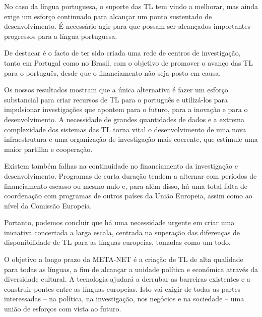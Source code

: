 \documentclass[]{../metanetpaper}
\begin{document}
\begin{multicols}{2}
No caso da língua portuguesa, o suporte das TL tem vindo a melhorar, mas ainda exige um esforço continuado para alcançar um ponto sustentado de desenvolvimento. É necessário agir para que possam ser alcançados importantes progressos para a língua portuguesa.

De destacar é o facto de ter sido criada uma rede de centros de investigação, tanto em Portugal como no Brasil, com o objetivo de promover o avanço das TL para o português, desde que o financiamento não seja posto em causa.

Os nossos resultados mostram que a única alternativa é fazer um esforço substancial para criar recursos de TL para o português e utilizá-los para impulsionar investigações que apontem para o futuro, para a inovação e para o desenvolvimento. A necessidade de grandes quantidades de dados e a extrema complexidade dos sistemas das TL torna vital o desenvolvimento de uma nova infraestrutura e uma organização de investigação mais coerente, que estimule uma maior partilha e cooperação.

Existem também falhas na continuidade no financiamento da investigação e desenvolvimento. Programas de curta duração tendem a alternar com períodos de financiamento escasso ou mesmo nulo e, para além disso, há uma total falta de coordenação com programas de outros países da União Europeia, assim como ao nível da Comissão Europeia.

Portanto, podemos concluir que há uma necessidade urgente em criar uma iniciativa concertada a larga escala, centrada na superação das diferenças de disponibilidade de TL para as línguas europeias, tomadas como um todo.

O objetivo a longo prazo da META-NET é a criação de TL de alta qualidade para todas as línguas, a fim de alcançar a unidade política e económica através da diversidade cultural. A tecnologia ajudará a derrubar as barreiras existentes e a construir pontes entre as línguas europeias. Isto vai exigir de todas as partes interessadas – na política, na investigação, nos negócios e na sociedade – uma união de esforços com vista ao futuro.
\end{multicols}

\cleardoublepage


\end{document}

